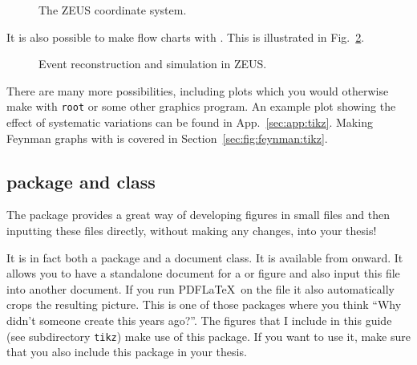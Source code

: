 \begin{figure}[htbp]
  \centering
   {%
  }{%
    
  }
  \caption{The ZEUS coordinate system.}
  \label{fig:tikz:coord}
\end{figure}

It is also possible to make flow charts with \TikZ. This is
illustrated in Fig.~\ref{fig:tikz:flow}.

\begin{figure}[htbp]
  \centering
   {%
  }{%
    
  }
  \caption[Event reconstruction and simulation in ZEUS]{Event reconstruction and simulation in ZEUS.}
  \label{fig:tikz:flow}
\end{figure}

There are many more possibilities,
including plots which you would otherwise make with \texttt{root} or
some other graphics program. An example plot showing the effect of
systematic variations can be found in App.~\ref{sec:app:tikz}. Making
Feynman graphs with \TikZ is covered in
Section~\ref{sec:fig:feynman:tikz}.


\subsection{ package and class}
\label{sec:fig:standalone}

The  package provides a great way of developing
figures in small files and then inputting these files directly,
without making any changes, into your thesis!

It is in fact both a package and a document class. It is
available from  onward. It allows you to have a
standalone document for a  or  figure
and also input this file into another document. If you run PDF\LaTeX\
on the file it also automatically crops the resulting picture. This is
one of those packages where you think \enquote{Why didn't someone
  create this years ago?}. The \TikZ figures that I include in this
guide (see subdirectory \texttt{tikz}) make use of this package. If
you want to use it, make sure that you also include this package in
your thesis.


